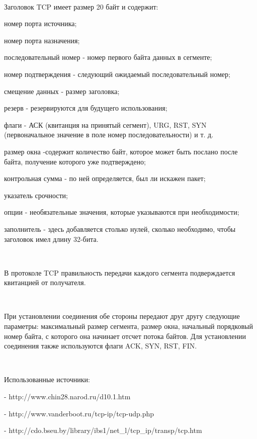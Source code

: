 \documentclass{article}
\begin{document}
~\

Заголовок TCP имеет размер 20 байт и содержит:
\begin{compactitem}
\item номер порта источника;
\item номер порта назначения;
\item последовательный номер - номер первого байта данных в сегменте;
\item номер подтверждения - следующий ожидаемый последовательный номер;
\item смещение данных - размер заголовка;
\item резерв - резервируются для будущего использования;
\item флаги - АСК (квитанция на принятый сегмент), URG, RST, SYN (первоначальное значение в поле номер последовательности) и т. д.
\item размер окна -содержит количество байт, которое может быть послано после байта, получение которого уже подтверждено;
\item контрольная сумма - по ней определяется, был ли искажен пакет;
\item указатель срочности;
\item опции - необязательные значения, которые указываются при необходимости;
\item заполнитель - здесь добавляется столько нулей, сколько необходимо, чтобы заголовок имел длину 32-бита.
\end{compactitem}

~\

В протоколе TCP правильность передачи каждого сегмента подверждается квитанцией от получателя.

~\

При установлении соединения обе стороны передают друг другу следующие параметры: максимальный размер сегмента, размер окна, начальный порядковый номер байта, с которого она начинает отсчет потока байтов. Для установлении соединения также используются флаги ACK, SYN, RST, FIN.

~\

Использованные источники:

- http://www.chin28.narod.ru/d10.1.htm 

- http://www.vanderboot.ru/tcp-ip/tcp-udp.php

- http://cdo.bseu.by/library/ibs1/net\_l/tcp\_ip/transp/tcp.htm
\end{document}
